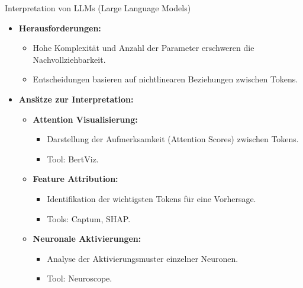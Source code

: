 \documentclass[aspectratio=1610, xcolor=dvipsnames, 9pt]{beamer}
\begin{document}
\begin{frame}{Interpretation von LLMs (Large Language Models)}
  \begin{itemize}
    \item \textbf{Herausforderungen:}
    \begin{itemize}
      \item Hohe Komplexität und Anzahl der Parameter erschweren die Nachvollziehbarkeit.
      \item Entscheidungen basieren auf nichtlinearen Beziehungen zwischen Tokens.
    \end{itemize}
    \item \textbf{Ansätze zur Interpretation:}
    \begin{itemize}
      \item \textbf{Attention Visualisierung:}
      \begin{itemize}
        \item Darstellung der Aufmerksamkeit (Attention Scores) zwischen Tokens.
        \item Tool: BertViz.
      \end{itemize}
      \item \textbf{Feature Attribution:}
      \begin{itemize}
        \item Identifikation der wichtigsten Tokens für eine Vorhersage.
        \item Tools: Captum, SHAP.
      \end{itemize}
      \item \textbf{Neuronale Aktivierungen:}
      \begin{itemize}
        \item Analyse der Aktivierungsmuster einzelner Neuronen.
        \item Tool: Neuroscope.
      \end{itemize}
    \end{itemize}
  \end{itemize}
\end{frame}
\end{document}
